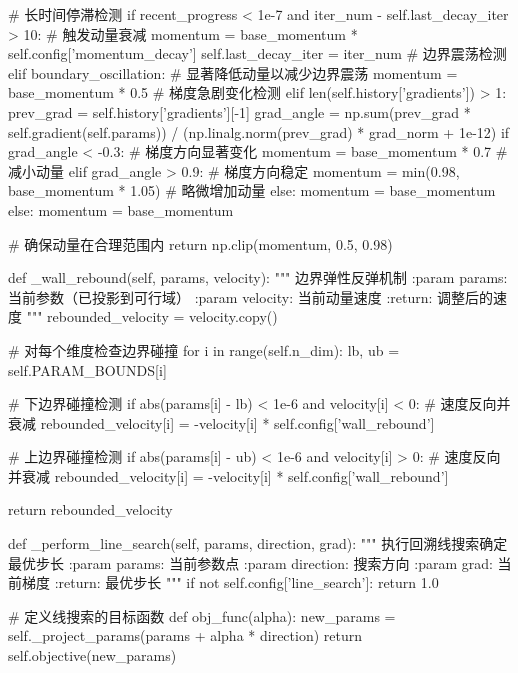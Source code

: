 \documentclass[a4paper,12pt]{article}
\begin{document}
\begin{python}
        # 长时间停滞检测
        if recent_progress < 1e-7 and iter_num - self.last_decay_iter > 10:
            # 触发动量衰减
            momentum = base_momentum * self.config['momentum_decay']
            self.last_decay_iter = iter_num
        # 边界震荡检测
        elif boundary_oscillation:
            # 显著降低动量以减少边界震荡
            momentum = base_momentum * 0.5
        # 梯度急剧变化检测
        elif len(self.history['gradients']) > 1:
            prev_grad = self.history['gradients'][-1]
            grad_angle = np.sum(prev_grad * self.gradient(self.params)) / (np.linalg.norm(prev_grad) * grad_norm + 1e-12)
            if grad_angle < -0.3:  # 梯度方向显著变化
                momentum = base_momentum * 0.7  # 减小动量
            elif grad_angle > 0.9:  # 梯度方向稳定
                momentum = min(0.98, base_momentum * 1.05)  # 略微增加动量
            else:
                momentum = base_momentum
        else:
            momentum = base_momentum
            
        # 确保动量在合理范围内
        return np.clip(momentum, 0.5, 0.98)

    def _wall_rebound(self, params, velocity):
        """
        边界弹性反弹机制
        :param params: 当前参数（已投影到可行域）
        :param velocity: 当前动量速度
        :return: 调整后的速度
        """
        rebounded_velocity = velocity.copy()
        
        # 对每个维度检查边界碰撞
        for i in range(self.n_dim):
            lb, ub = self.PARAM_BOUNDS[i]
            
            # 下边界碰撞检测
            if abs(params[i] - lb) < 1e-6 and velocity[i] < 0:
                # 速度反向并衰减
                rebounded_velocity[i] = -velocity[i] * self.config['wall_rebound']
                
            # 上边界碰撞检测
            if abs(params[i] - ub) < 1e-6 and velocity[i] > 0:
                # 速度反向并衰减
                rebounded_velocity[i] = -velocity[i] * self.config['wall_rebound']
                
        return rebounded_velocity

    def _perform_line_search(self, params, direction, grad):
        """
        执行回溯线搜索确定最优步长
        :param params: 当前参数点
        :param direction: 搜索方向
        :param grad: 当前梯度
        :return: 最优步长
        """
        if not self.config['line_search']:
            return 1.0
            
        # 定义线搜索的目标函数
        def obj_func(alpha):
            new_params = self._project_params(params + alpha * direction)
            return self.objective(new_params)
            

\end{python}
\end{document}
